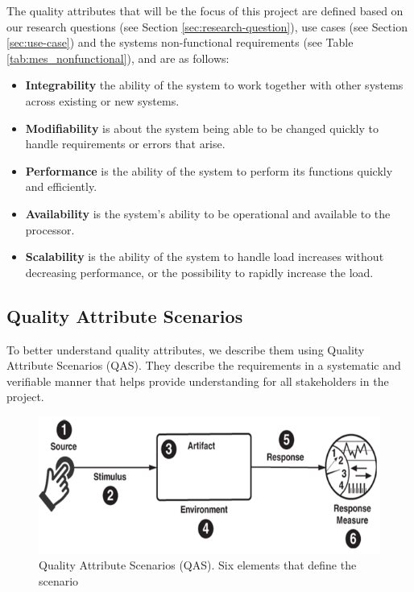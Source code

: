 The quality attributes that will be the focus of this project are defined based on our research questions (see Section \ref{sec:research-question}), use cases (see Section \ref{sec:use-case}) and the systems non-functional requirements (see Table \ref{tab:mes_nonfunctional}), and are as follows:
\begin{itemize}
    \item \textbf{Integrability} the ability of the system to work together with other systems across existing or new systems.
    \item \textbf{Modifiability} is about the system being able to be changed quickly to handle requirements or errors that arise.
    \item \textbf{Performance} is the ability of the system to perform its functions quickly and efficiently.
    \item \textbf{Availability} is the system's ability to be operational and available to the processor.
     \item \textbf{Scalability} is the ability of the system to handle load increases without decreasing performance, or the possibility to rapidly increase the load.
\end{itemize}





\subsection{Quality Attribute Scenarios}
To better understand quality attributes, we describe them using Quality Attribute Scenarios (QAS). They describe the requirements in a systematic and verifiable manner that helps provide understanding for all stakeholders in the project.

\begin{figure}[H]
    \centering
    \caption{\centering Quality Attribute Scenarios (QAS). Six elements that define the scenario}
    \label{fig:qas-diagram}
    \includegraphics[width=0.93\linewidth]{images/qas.png} 
\end{figure}


